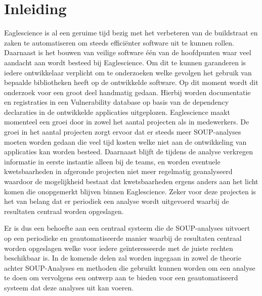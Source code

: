 \chapter{Inleiding}\label{ch:impl-inleiding}
Eaglescience is al een geruime tijd bezig met het verbeteren van de buildstraat en zaken te automatiseren om steeds efficiënter software uit te kunnen rollen. Daarnaast is het bouwen van veilige software één van de hoofdpunten waar veel aandacht aan wordt besteed bij Eaglescience. Om dit te kunnen garanderen is iedere ontwikkelaar verplicht om te onderzoeken welke gevolgen het gebruik van bepaalde bibliotheken heeft op de ontwikkelde software. Op dit moment wordt dit onderzoek voor een groot deel handmatig gedaan. Hierbij worden documentatie en registraties in een Vulnerability database op basis van de dependency declaraties in de ontwikkelde applicaties uitgeplozen.
Eaglescience maakt momenteel een groei door in zowel het aantal projecten als in medewerkers. De groei in het aantal projecten zorgt ervoor dat er steeds meer SOUP-analyses moeten worden gedaan die veel tijd kosten welke niet aan de ontwikkeling van applicaties kan worden besteed. Daarnaast blijft de tijdens de analyse verkregen informatie in eerste instantie alleen bij de teams, en worden eventuele kwetsbaarheden in afgeronde projecten niet meer regelmatig geanalyseerd waardoor de mogelijkheid bestaat dat kwetsbaarheden ergens anders aan het licht komen die onopgemerkt blijven binnen Eaglescience. Zeker voor deze projecten is het van belang dat er periodiek een analyse wordt uitgevoerd waarbij de resultaten centraal worden opgeslagen.

Er is dus een behoefte aan een centraal systeem die de SOUP-analyses uitvoert op een periodieke en geautomatiseerde manier waarbij de resultaten centraal worden opgeslagen welke voor iedere geïnteresseerde met de juiste rechten beschikbaar is. In de komende delen zal worden ingegaan in zowel de theorie achter SOUP-Analyses en methoden die gebruikt kunnen worden om een analyse te doen om vervolgens een ontwerp aan te bieden voor een geautomatiseerd systeem dat deze analyses uit kan voeren.
